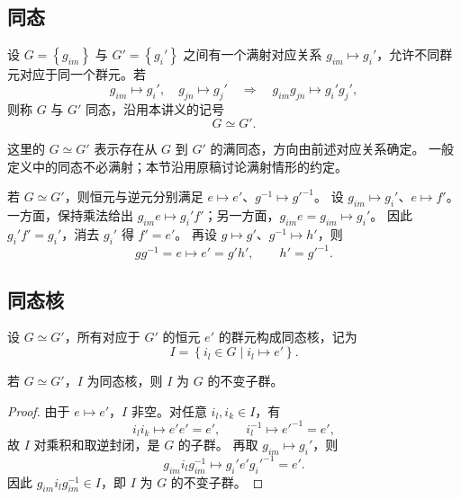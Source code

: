 \subsection{同态}
\begin{definition}[同态]
设 $G=\left\{g_{im}\right\}$ 与 $G'=\left\{g_i'\right\}$ 之间有一个满射对应关系
$g_{im}\mapsto g_i'$，允许不同群元对应于同一个群元。若
\begin{equation}
g_{im}\mapsto g_i',\quad g_{jn}\mapsto g_j'
\quad\Longrightarrow\quad g_{im}g_{jn}\mapsto g_i'g_j',
\end{equation}
则称 $G$ 与 $G'$ 同态，沿用本讲义的记号
\begin{equation}
G\simeq G'.
\end{equation}
\end{definition}
这里的 $G\simeq G'$ 表示存在从 $G$ 到 $G'$ 的满同态，方向由前述对应关系确定。
一般定义中的同态不必满射；本节沿用原稿讨论满射情形的约定。

若 $G\simeq G'$，则恒元与逆元分别满足 $e\mapsto e'$、$g^{-1}\mapsto g'^{-1}$。
设 $g_{im}\mapsto g_i'$、$e\mapsto f'$。一方面，保持乘法给出
$g_{im}e\mapsto g_i'f'$；另一方面，$g_{im}e=g_{im}\mapsto g_i'$。
因此 $g_i'f'=g_i'$，消去 $g_i'$ 得 $f'=e'$。
再设 $g\mapsto g'$、$g^{-1}\mapsto h'$，则
\begin{equation}
gg^{-1}=e\mapsto e'=g'h',\qquad h'=g'^{-1}.
\end{equation}

\subsection{同态核}
\begin{definition}[同态核]
设 $G\simeq G'$，所有对应于 $G'$ 的恒元 $e'$ 的群元构成同态核，记为
\begin{equation}
I=\left\{i_l\in G\mid i_l\mapsto e'\right\}.
\end{equation}
\end{definition}

\begin{theorem}[同态核定理]
若 $G\simeq G'$，$I$ 为同态核，则 $I$ 为 $G$ 的不变子群。
\end{theorem}
\begin{proof}
由于 $e\mapsto e'$，$I$ 非空。对任意 $i_l,i_k\in I$，有
\begin{equation}
i_li_k\mapsto e'e'=e',\qquad i_l^{-1}\mapsto e'^{-1}=e',
\end{equation}
故 $I$ 对乘积和取逆封闭，是 $G$ 的子群。
再取 $g_{im}\mapsto g_i'$，则
\begin{equation}
g_{im}i_lg_{im}^{-1}\mapsto g_i'e'g_i'^{-1}=e'.
\end{equation}
因此 $g_{im}i_lg_{im}^{-1}\in I$，即 $I$ 为 $G$ 的不变子群。
\end{proof}

